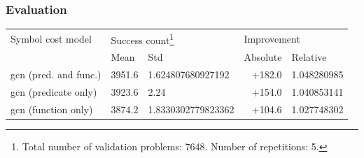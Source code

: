 \documentclass[a4paper]{beamer}
\begin{document}
\begin{frame}
\frametitle{Evaluation}

\fontsize{10pt}{12}\selectfont

\centering
\begin{tabular}{l|ll|rl}

Symbol cost model & \multicolumn{2}{l}{Success count\footnote{Total number of validation problems: \num{7648}. Number of repetitions: 5.}} & \multicolumn{2}{l}{Improvement} \\
& Mean & Std & Absolute & Relative \\

\hline


\acrshort{gcn} (pred. and func.) &
\num{3951.6} &
\num[round-mode=places,round-precision=2]{1.624807680927192} &
+182.0 &
\num[round-mode=places,round-precision=3]{1.048280985} \\


\acrshort{gcn} (predicate only) &
\num{3923.6} &
\num{2.24} &
+154.0 &
\num[round-mode=places,round-precision=3]{1.040853141} \\


\acrshort{gcn} (function only) &
\num{3874.2} &
\num[round-mode=places,round-precision=2]{1.8330302779823362} &
+104.6 &
\num[round-mode=places,round-precision=3]{1.027748302} \\



\end{tabular}
\end{frame}
\end{document}
